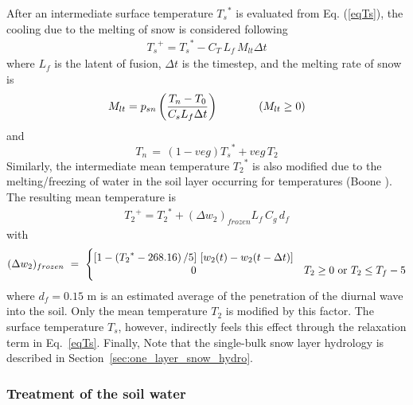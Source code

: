 After an intermediate surface
temperature ${T_s}^*$ is evaluated from Eq. (\ref{eqTs}), the cooling
due to the melting of snow is considered following
\begin{eqnarray}
{T_s}^+ = {T_s}^\ast - C_T \,L_f \,M_{lt}\Delta t
\end{eqnarray}
where $L_f$ is the latent of fusion, $\Delta t$ is the timestep,
and the melting rate of snow is
\begin{eqnarray}
M_{lt} = p_{sn} \left( \frac{ T_n - T_0 }{ C_s L_f \Delta t } \right)
\hskip.5in
\left(M_{lt}\geq 0\right)
\end{eqnarray}
%
and
%
\begin{equation}
%
T_n \, = \, (1-veg) {T_s}^\ast + veg \, T_2
%
\end{equation}
%
Similarly, the intermediate mean temperature ${T_2}^\ast$ 
is also modified due to the melting/freezing of
water in the soil layer occurring for temperatures
(Boone \nocite{Boone2000}).
The resulting mean temperature is
\begin{eqnarray}
{T_2}^+ = {T_2}^\ast + \left(\Delta w_2\right)_{frozen} L_f \, C_g \, d_f
\end{eqnarray}
with
%
\begin{equation}
%
(\Delta w_2)_{frozen} \,\, = \,\, \Bigg\lbrace
%
\begin{matrix}
%
\left[ 1 - \left({T_2}^\ast-268.16\right)/5 
\right] \, \left[ w_2(t) - w_2(t-\Delta t) \right] 
\\
0 
&
T_2 \geq 0
\,\,{\rm or}\,\,
T_2 \leq T_f-5
%
\end{matrix}
%
\end{equation}
%
where $d_f=0.15$ m is an estimated average of the penetration of the
diurnal wave into the soil.
Only the mean temperature $T_2$ is modified
by this factor.
The surface temperature $T_s$, however, indirectly
feels this effect through the relaxation term in Eq.~\ref{eqTs}.
%
Finally,
Note that the single-bulk snow layer hydrology is described in 
Section~\ref{sec:one_layer_snow_hydro}.


\subsubsection{Treatment of the soil water}
\label{sec:isba_runoff}

